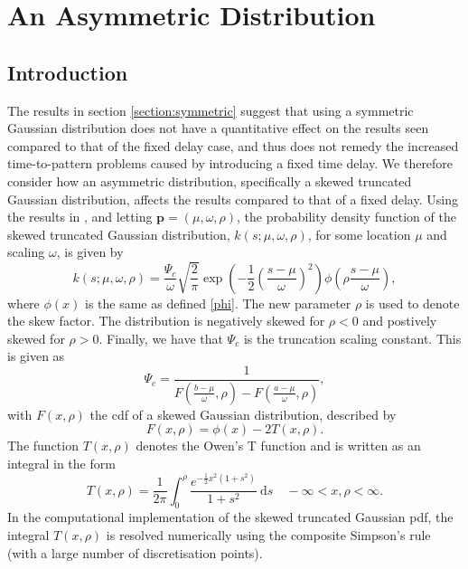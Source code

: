 \section{An Asymmetric Distribution}
\subsection{Introduction}
The results in section \ref{section:symmetric} suggest that using a symmetric Gaussian distribution does not have a quantitative effect on the results seen compared to that of the fixed delay case, and thus does not remedy the increased time-to-pattern problems caused by introducing a fixed time delay. We therefore consider how an asymmetric distribution, specifically a skewed truncated Gaussian distribution, affects the results compared to that of a fixed delay. Using the results in \cite{skewed}, and letting $\textbf{p}=(\mu,\omega,\rho)$, the probability density function of the skewed truncated Gaussian distribution, $k(s;\mu,\omega,\rho)$, for some location $\mu$ and scaling $\omega$, is given by
\begin{equation}
    k(s;\mu,\omega,\rho)=\frac{\Psi_c}{\omega}\sqrt{\frac{2}{\pi}}\exp\left(-\frac{1}{2}\left(\frac{s-\mu}{\omega}\right)^2\right)\phi\left(\rho\frac{s-\mu}{\omega}\right),
\end{equation}
where $\phi(x)$ is the same as defined \eqref{phi}. The new parameter $\rho$ is used to denote the skew factor. The distribution is negatively skewed for $\rho<0$ and postively skewed for $\rho>0$. Finally, we have that $\Psi_c$ is the truncation scaling constant. This is given as
\begin{equation}
    \Psi_c=\frac{1}{F\left(\frac{b-\mu}{\omega},\rho\right)-F\left(\frac{a-\mu}{\omega},\rho\right)},
\end{equation}
with $F(x,\rho)$ the cdf of a skewed Gaussian distribution, described by
\begin{equation}
    F(x,\rho)=\phi(x)-2T(x,\rho).
\end{equation}
The function $T(x,\rho)$ denotes the Owen's T function \cite{owenst} and is written as an integral in the form
\begin{equation}
    T(x,\rho)=\frac{1}{2\pi}\int_0^\rho\frac{e^{-\frac{1}{2}x^2(1+s^2)}}{1+s^2}\ \text{d}s\quad -\infty<x,\rho<\infty.
\end{equation}
In the computational implementation of the skewed truncated Gaussian pdf, the integral $T(x,\rho)$ is resolved numerically using the composite Simpson's rule (with a large number of discretisation points).

